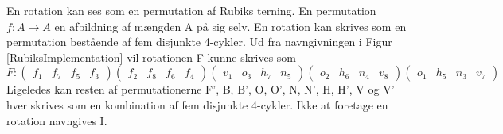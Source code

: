 \documentclass[../main.tex]{subfiles}
\begin{document}
En rotation kan ses som en permutation af Rubiks terning.
En permutation $f:A\rightarrow A$ en afbildning af mængden A på sig selv.
En rotation kan skrives som en permutation bestående af fem disjunkte 4-cykler.
Ud fra navngivningen i Figur \ref{RubiksImplementation} vil rotationen F kunne skrives som
$$F:(\begin{matrix}f_1 & f_7 & f_5 & f_3\end{matrix})
(\begin{matrix}f_2 & f_8 & f_6 & f_4\end{matrix})
(\begin{matrix}v_1 & o_3 & h_7 & n_5\end{matrix})
(\begin{matrix}o_2 & h_6 & n_4 & v_8\end{matrix})
(\begin{matrix}o_1 & h_5 & n_3 & v_7\end{matrix})$$
\noindent
Ligeledes kan resten af permutationerne F', B, B', O, O', N, N', H, H', V og V' hver skrives som en kombination af fem disjunkte 4-cykler.
Ikke at foretage en rotation navngives I.
\end{document}
